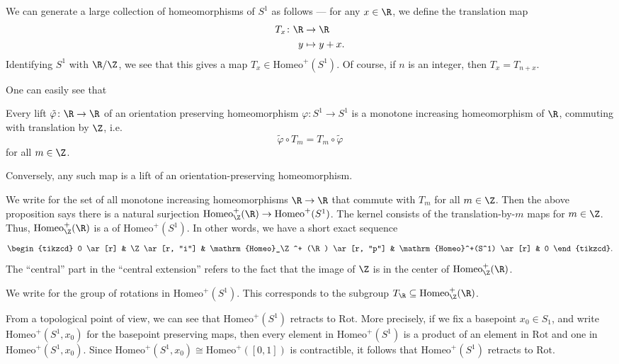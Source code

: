 \documentclass[a4paper]{article}
\newcommand\Homeo{\mathrm{Homeo}}
\newcommand\Rot{\mathrm{Rot}}
\begin{document}
We can generate a large collection of homeomorphisms of $S^1$ as follows --- for any $x \in \R$, we define the translation map
\begin{align*}
  T_x\colon \R &\to \R\\
  y &\mapsto y + x.
\end{align*}
Identifying $S^1$ with $\R/\Z$, we see that this gives a map $T_x \in \Homeo^+(S^1)$. Of course, if $n$ is an integer, then $T_x = T_{n + x}$.

One can easily see that
\begin{prop}
  Every lift $\tilde{\varphi}\colon \R \to \R$ of an orientation preserving homeomorphism $\varphi\colon S^1 \to S^1$ is a monotone increasing homeomorphism of $\R$, commuting with translation by $\Z$, i.e.
  \[
    \tilde{\varphi} \circ T_m = T_m \circ \tilde{\varphi}
  \]
  for all $m \in \Z$.

  Conversely, any such map is a lift of an orientation-preserving homeomorphism.
\end{prop}
We write \term{$\Homeo^+_\Z(\R)$} for the set of all monotone increasing homeomorphisms $\R \to \R$ that commute with $T_m$ for all $m \in \Z$. Then the above proposition says there is a natural surjection $\Homeo^+_\Z(\R) \to \Homeo^+(S^1)$. The kernel consists of the translation-by-$m$ maps for $m \in \Z$. Thus, $\Homeo^+_\Z(\R)$ is a  of $\Homeo^+(S^1)$. In other words, we have a short exact sequence
\[
  \begin{tikzcd}
   0 \ar[r] & \Z \ar[r, "i"] & \Homeo_\Z^+ (\R) \ar[r, "p"] & \Homeo^+(S^1) \ar[r] & 0
  \end{tikzcd}.
\]
The ``central'' part in the ``central extension'' refers to the fact that the image of $\Z$ is in the center of $\Homeo_\Z^+(\R)$.

\begin{notation}
  We write \term{$\Rot$} for the group of rotations in $\Homeo^+(S^1)$. This corresponds to the subgroup $T_\R \subseteq \Homeo_\Z^+(\R)$.
\end{notation}

From a topological point of view, we can see that $\Homeo^+(S^1)$ retracts to $\Rot$. More precisely, if we fix a basepoint $x_0 \in S_1$, and write $\Homeo^+(S^1, x_0)$ for the basepoint preserving maps, then every element in $\Homeo^+(S^1)$ is a product of an element in $\Rot$ and one in $\Homeo^+(S^1, x_0)$. Since $\Homeo^+(S^1, x_0) \cong \Homeo^+([0, 1])$ is contractible, it follows that $\Homeo^+(S^1)$ retracts to $\Rot$.
\end{document}
